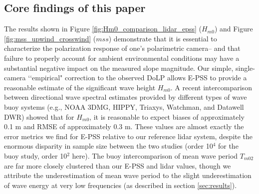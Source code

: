 \documentclass[letterpaper,journal]{IEEEtran}
\begin{document}
\subsection{Core findings of this paper}

The results shown in Figure \ref{fig:Hm0_comparison_lidar_epss} ($H_{m0}$) and Figure \ref{fig:mss_upwind_crosswind} ($mss$) demonstrate that it is essential to characterize the polarization response of one's polarimetric camera-- and that failure to properly account for ambient environmental conditions may have a substantial negative impact on the measured slope magnitude. Our simple, single-camera \lq\lq empirical" correction to the observed DoLP allows E-PSS to provide a reasonable estimate of the significant wave height $H_{m0}$. A recent intercomparison \cite{jensen_quantifying_2021} between directional wave spectral estimates provided by different types of wave buoy systems (e.g., NOAA 3DMG, HIPPY, Triaxys, Watchman, and Datawell DWR) showed that for $H_{m0}$, it is reasonable to expect biases of approximately 0.1 m and RMSE of approximately 0.3 m. These values are almost exactly the error metrics we find for E-PSS relative to our reference lidar system, despite the enormous disparity in sample size between the two studies (order 10$^4$ for the buoy study, order 10$^2$ here). The buoy intercomparison of mean wave period $T_{m02}$ are far more closely clustered than our E-PSS and lidar values, though we attribute the underestimation of mean wave period to the slight underestimation of wave energy at very low frequencies (as described in section \ref{sec:results}).
\end{document}
